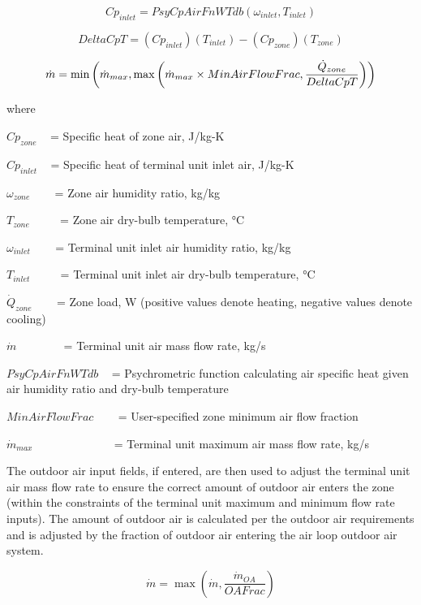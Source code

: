 \begin{equation}
C{p_{inlet}} = PsyCpAirFnWTdb\left( {{\omega_{inlet}},{T_{inlet}}} \right)
\end{equation}

\begin{equation}
DeltaCpT = \left( {C{p_{inlet}}} \right)\left( {{T_{inlet}}} \right) - \left( {C{p_{zone}}} \right)\left( {{T_{zone}}} \right)
\end{equation}

\begin{equation}
  \dot{m} = \min \left( \dot{m}_{max}, \max \left( \dot{m}_{max}\times MinAirFlowFrac,\frac{\dot{Q}_{zone}}{DeltaCpT} \right) \right)
\end{equation}

where

\(C{p_{zone}}\) ~ = Specific heat of zone air, J/kg-K

\(C{p_{inlet}}\) ~ = Specific heat of terminal unit inlet air, J/kg-K

\({\omega_{zone}}\) ~~~ = Zone air humidity ratio, kg/kg

\({T_{zone}}\) ~~~~ = Zone air dry-bulb temperature, °C

\({\omega_{inlet}}\) ~~~ = Terminal unit inlet air humidity ratio, kg/kg

\({T_{inlet}}\) ~~~~ = Terminal unit inlet air dry-bulb temperature, °C

\({\dot Q_{zone}}\) ~~~ = Zone load, W (positive values denote heating, negative values denote cooling)

\(\dot m\) ~~~~~~~ = Terminal unit air mass flow rate, kg/s

\(PsyCpAirFnWTdb\) ~ = Psychrometric function calculating air specific heat given air humidity ratio and dry-bulb temperature

\(MinAirFlowFrac\) ~~~ = User-specified zone minimum air flow fraction

\({\dot m_{max}}\) ~~~~~~~~~~~~~ = Terminal unit maximum air mass flow rate, kg/s

The outdoor air input fields, if entered, are then used to adjust the terminal unit air mass flow rate to ensure the correct amount of outdoor air enters the zone (within the constraints of the terminal unit maximum and minimum flow rate inputs). The amount of outdoor air is calculated per the outdoor air requirements and is adjusted by the fraction of outdoor air entering the air loop outdoor air system.

\begin{equation}
\dot m = \max \left( \dot m, \frac{\dot m_{OA}}{OAFrac} \right)
\end{equation}

